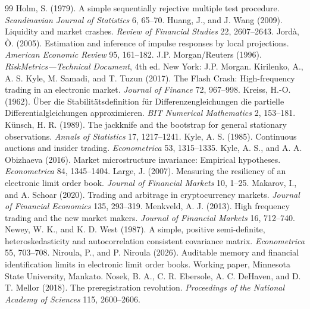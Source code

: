 \begin{thebibliography}{99}
 Holm, S. (1979). A simple sequentially rejective multiple test procedure. \emph{Scandinavian Journal of Statistics} 6, 65--70.
 Huang, J., and J. Wang (2009). Liquidity and market crashes. \emph{Review of Financial Studies} 22, 2607--2643.
 Jord\`a, \`O. (2005). Estimation and inference of impulse responses by local projections. \emph{American Economic Review} 95, 161--182.
 J.P. Morgan/Reuters (1996). \emph{RiskMetrics---Technical Document}, 4th ed. New York: J.P. Morgan.
 Kirilenko, A., A. S. Kyle, M. Samadi, and T. Tuzun (2017). The Flash Crash: High-frequency trading in an electronic market. \emph{Journal of Finance} 72, 967--998.
 Kreiss, H.-O. (1962). \"Uber die Stabilit\"atsdefinition f\"ur Differenzengleichungen die partielle Differentialgleichungen approximieren. \emph{BIT Numerical Mathematics} 2, 153--181.
 K\"unsch, H. R. (1989). The jackknife and the bootstrap for general stationary observations. \emph{Annals of Statistics} 17, 1217--1241.
 Kyle, A. S. (1985). Continuous auctions and insider trading. \emph{Econometrica} 53, 1315--1335.
 Kyle, A. S., and A. A. Obizhaeva (2016). Market microstructure invariance: Empirical hypotheses. \emph{Econometrica} 84, 1345--1404.
 Large, J. (2007). Measuring the resiliency of an electronic limit order book. \emph{Journal of Financial Markets} 10, 1--25.
 Makarov, I., and A. Schoar (2020). Trading and arbitrage in cryptocurrency markets. \emph{Journal of Financial Economics} 135, 293--319.
 Menkveld, A. J. (2013). High frequency trading and the new market makers. \emph{Journal of Financial Markets} 16, 712--740.
 Newey, W. K., and K. D. West (1987). A simple, positive semi-definite, heteroskedasticity and autocorrelation consistent covariance matrix. \emph{Econometrica} 55, 703--708.
 Niroula, P., and P. Niroula (2026). Auditable memory and financial identification limits in electronic limit order books. Working paper, Minnesota State University, Mankato.
 Nosek, B. A., C. R. Ebersole, A. C. DeHaven, and D. T. Mellor (2018). The preregistration revolution. \emph{Proceedings of the National Academy of Sciences} 115, 2600--2606.

\end{thebibliography}
